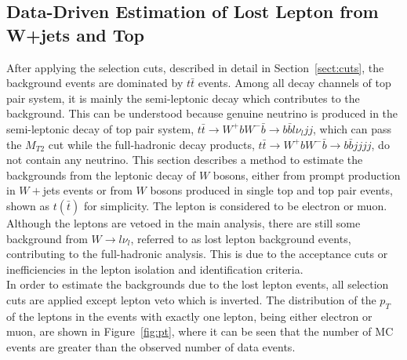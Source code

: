 \newpage
\subsection{Data-Driven Estimation of Lost Lepton from W+jets and Top}
\label{sect:intro}
After applying the selection cuts, described in detail in Section~\ref{sect:cuts}, the background 
events are dominated by $t\bar t$ events. Among all decay channels of top pair system, 
it is mainly the semi-leptonic decay which contributes to the background. 
This can be understood because genuine neutrino is produced in the semi-leptonic decay of 
top pair system, $t\bar t\rightarrow W^+bW^-\bar b\rightarrow b\bar bl\nu_ljj$, 
which can pass the $M_{T2}$ cut while the full-hadronic decay products, $t\bar t\rightarrow W^+bW^-\bar b\rightarrow b\bar bjjjj$, do not contain any neutrino.
This section describes a method to estimate the backgrounds from the leptonic decay of $W$ bosons, 
either from prompt production in $W+$jets events or from $W$ bosons produced in single top and 
top pair events, shown as $t(\bar t)$ for simplicity. The lepton is considered to be electron or muon.\\
Although the leptons are vetoed in the main analysis, there are still some background 
from $W\rightarrow l\nu_l$, referred to as lost lepton background events, 
contributing to the full-hadronic analysis. This is due to the acceptance cuts or 
inefficiencies in the lepton isolation and identification criteria.\\
In order to estimate the backgrounds due to the lost lepton events, all selection cuts are applied except
 lepton veto which is inverted. The distribution of the $p_T$ of the leptons in the events 
with exactly one lepton, being either electron or muon, are shown in 
Figure~\ref{fig:pt}, where it can be seen that the number of MC events are greater than the 
observed number of data events.\\
